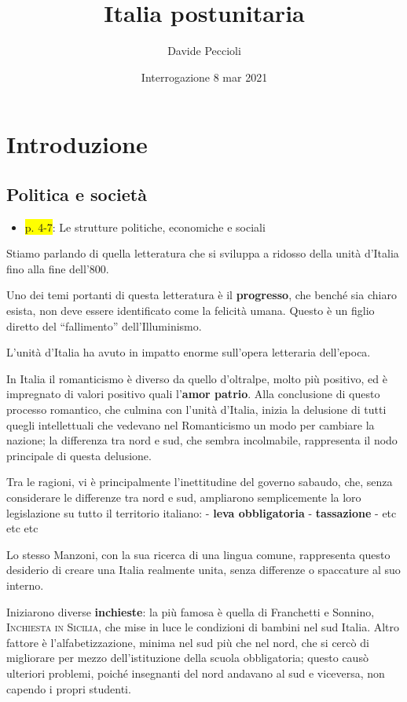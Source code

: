 \documentclass{book}
\title{Italia postunitaria}
\date{Interrogazione 8 mar 2021}
\author{Davide Peccioli}
\newcommand{\pagine}[1]{\colorbox{yellow}{#1}}
\begin{document}
\maketitle

\tableofcontents
\setcounter{secnumdepth}{-1}

\chapter{Introduzione}

\section{Politica e società}

\begin{itemize}
\item
  \pagine{p. 4-7}: Le strutture politiche, economiche e sociali
\end{itemize}

Stiamo parlando di quella letteratura che si sviluppa a ridosso della
unità d'Italia fino alla fine dell'800.

Uno dei temi portanti di questa letteratura è il \textbf{progresso}, che
benché sia chiaro esista, non deve essere identificato come la felicità
umana. Questo è un figlio diretto del ``fallimento'' dell'Illuminismo.

L'unità d'Italia ha avuto in impatto enorme sull'opera letteraria
dell'epoca.

In Italia il romanticismo è diverso da quello d'oltralpe, molto più
positivo, ed è impregnato di valori positivo quali l'\textbf{amor
patrio}. Alla conclusione di questo processo romantico, che culmina con
l'unità d'Italia, inizia la delusione di tutti quegli intellettuali che
vedevano nel Romanticismo un modo per cambiare la nazione; la differenza
tra nord e sud, che sembra incolmabile, rappresenta il nodo principale
di questa delusione.

Tra le ragioni, vi è principalmente l'inettitudine del governo sabaudo,
che, senza considerare le differenze tra nord e sud, ampliarono
semplicemente la loro legislazione su tutto il territorio italiano: -
\textbf{leva obbligatoria} - \textbf{tassazione} - etc etc etc

Lo stesso Manzoni, con la sua ricerca di una lingua comune, rappresenta
questo desiderio di creare una Italia realmente unita, senza differenze
o spaccature al suo interno.

Iniziarono diverse \textbf{inchieste}: la più famosa è quella di
Franchetti e Sonnino, \textsc{Inchiesta in Sicilia}, che mise in luce le
condizioni di bambini nel sud Italia. Altro fattore è
l'alfabetizzazione, minima nel sud più che nel nord, che si cercò di
migliorare per mezzo dell'istituzione della scuola obbligatoria; questo
causò ulteriori problemi, poiché insegnanti del nord andavano al sud e
viceversa, non capendo i propri studenti.
\end{document}
